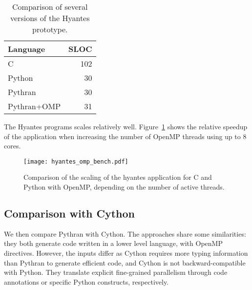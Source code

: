 \documentclass[conference]{IEEEtran}
\begin{document}
\begin{table}

    \caption{Comparison of several versions of the Hyantes prototype.}
    \label{tbl:hyantes}

    \centering
    \begin{tabular}{|l|r|}
        \hline
        Language & SLOC  \\
        \hline
        C       & 102   \\
        Python  & 30    \\
        Pythran & 30     \\
        Pythran+OMP    & 31  \\
        \hline
    \end{tabular}

\end{table}


The Hyantes programs scales relatively well. Figure~\ref{fig:hyantes-speedup} shows
the relative speedup of the application when increasing the number of OpenMP
threads using up to 8 cores.

\begin{figure}

    \caption{Comparison of the scaling of the hyantes application for C and
    Python with OpenMP, depending on the number of active threads.}
    \label{fig:hyantes-speedup}

    \texttt{[image: hyantes\_omp\_bench.pdf]}

\end{figure}


\subsection{Comparison with Cython}

We then compare Pythran with Cython. The approaches share some similarities:
they both generate code written in a lower level language, with OpenMP
directives. However, the inputs differ as Cython requires more typing
information than Pythran to generate efficient code, and Cython is not
backward-compatible with Python. They translate explicit fine-grained
parallelism through code annotations or specific Python constructs,
respectively.
\end{document}
